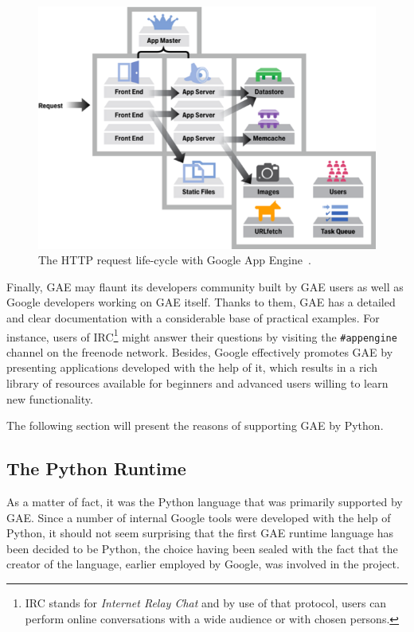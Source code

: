 \begin{figure}[ht]
\begin{center}
\includegraphics[scale=0.4]{img/gae_request.png}
\caption{The HTTP request life-cycle with Google App Engine~\cite{gae_request_cycle}.}
\label{fig:gae_request_cycle}
\end{center}
\end{figure}

Finally, GAE may flaunt its developers community built by GAE users as well as Google developers working on GAE itself. Thanks to them, GAE has a detailed and clear documentation with a considerable base of practical examples. For instance, users of IRC\footnote{IRC stands for \textit{Internet Relay Chat} and by use of that protocol, users can perform online conversations with a wide audience or with chosen persons.} might answer their questions by visiting the \texttt{\#appengine} channel on the freenode network. Besides, Google effectively promotes GAE by presenting applications developed with the help of it, which results in a rich library of resources available for beginners and advanced users willing to learn new functionality.

The following section will present the reasons of supporting GAE by Python. 
  
  
\subsection{The Python Runtime}\label{subsec:gae_py}
As a matter of fact, it was the Python language that was primarily supported by GAE. Since a number of internal Google tools were developed with the help of Python, it should not seem surprising that the first GAE runtime language has been decided to be Python, the choice having been sealed with the fact that the creator of the language, earlier employed by Google, was involved in the project.


